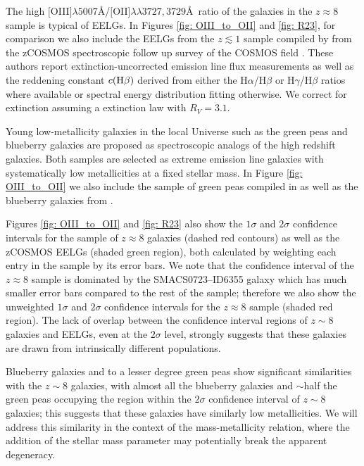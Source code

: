 \documentclass[twocolumn]{aastex631}
\begin{document}

The high $[$O{\footnotesize\;III}$]\lambda 5007$\AA/$[$O{\footnotesize\;II}$]\lambda \lambda 3727, 3729$\AA\ ratio of the galaxies in the $z \approx 8$ sample is typical of EELGs. In Figures \ref{fig: OIII_to_OII} and \ref{fig: R23}, for comparison we also include the EELGs from the $z \lesssim 1$ sample compiled by \cite{eelgs} from the zCOSMOS spectroscopic follow up survey \citep{zCOSMOS} of the COSMOS field \citep{COSMOS}. These authors report extinction-uncorrected emission line flux measurements as well as the reddening constant $c(\textnormal{H}\beta)$ derived from either the H$\alpha$/H$\beta$ or H$\gamma$/H$\beta$ ratios where available or spectral energy distribution fitting otherwise. We correct for extinction assuming a \cite{1989ApJ...345..245C} extinction law with $R_V = 3.1$. 

Young low-metallicity galaxies in the local Universe such as the green peas and blueberry galaxies \citep[see][]{2009MNRAS.399.1191C, yang+2017g, yang+2017b} are proposed as spectroscopic analogs of the high redshift galaxies. Both samples are selected as extreme emission line galaxies with systematically low metallicities at a fixed stellar mass. In Figure \ref{fig: OIII_to_OII} we also include the sample of green peas compiled in \cite{yang+2017g} as well as the blueberry galaxies from \cite{yang+2017b}. 

Figures \ref{fig: OIII_to_OII} and \ref{fig: R23} also show the $1\sigma$ and $2\sigma$ \citep[determined using the \texttt{seaborn} package][]{seaborn} confidence intervals for the sample of $z \approx 8$ galaxies (dashed red contours) as well as the zCOSMOS EELGs (shaded green region), both calculated by weighting each entry in the sample by its error bars. We note that the confidence interval of the $z \approx 8$ sample is dominated by the SMACS0723--ID6355 galaxy which has much smaller error bars compared to the rest of the sample; therefore we also show the unweighted $1\sigma$ and $2\sigma$ confidence intervals for the $z \approx 8$ sample (shaded red region). The lack of overlap between the confidence interval regions of $z \sim 8$ galaxies and EELGs, even at the $2\sigma$ level, strongly suggests that these galaxies are drawn from intrinsically different populations.

Blueberry galaxies and to a lesser degree green peas show significant similarities with the $z \sim 8$ galaxies, with almost all the blueberry galaxies and $\sim$half the green peas occupying the region within the $2\sigma$ confidence interval of $z \sim 8$ galaxies; this suggests that these galaxies have similarly low metallicities. We will address this similarity in the context of the mass-metallicity relation, where the addition of the stellar mass parameter may potentially break the apparent degeneracy. 
\end{document}

